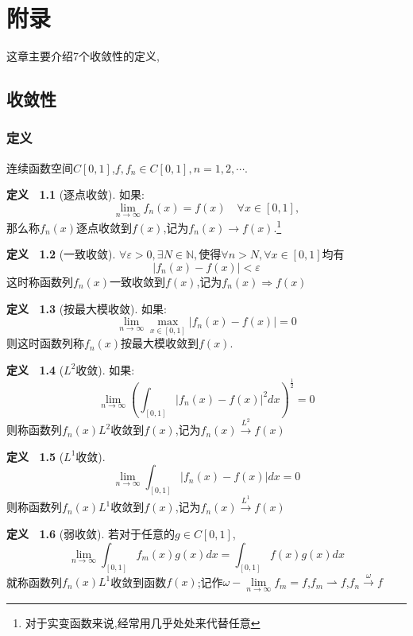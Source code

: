 \documentclass{ctexbook}
\theoremstyle{plain}
\theoremstyle{definition}
\newtheorem{defn}{定义~}[chapter]
\begin{document}
\chapter{附录}
这章主要介绍7个收敛性的定义,
\section{收敛性}
\subsection{定义}
\noindent
连续函数空间$C[0,1]$,$f,f_n\in C[0,1],n=1,2,\cdots$.

\begin{defn}[逐点收敛]\label{pointcon}
如果:
\[\lim_{n \to \infty}f_n(x)=f(x) \quad \forall x \in [0,1],\]
那么称$f_n(x)$逐点收敛到$f(x)$,记为$f_n(x)\rightarrow f(x)$.\footnote{对于实变函数来说,经常用几乎处处来代替任意}
\end{defn}

\begin{defn}[一致收敛]\label{uniformcon}
$\forall \varepsilon >0,\exists N\in \mathbb{N},使得\forall n>N,\forall x\in[0,1]$均有
\[|f_n(x)-f(x)|<\varepsilon\]
这时称函数列$f_n(x)$一致收敛到$f(x)$,记为$f_n(x)\Rightarrow f(x)$
\end{defn}

\begin{defn}[按最大模收敛]\label{maxcon}
如果:
\[\lim_{n \to \infty}\max_{x \in [0,1]}|f_n(x)-f(x)|=0\]
则这时函数列称$f_n(x)$按最大模收敛到$f(x)$.
\end{defn}

\begin{defn}[$L^2$收敛]如果:\label{ltwo}
\[\lim_{n \to \infty}\left(\int_{[0,1]} |f_n(x)-f(x)|^2dx\right) ^\frac{1}{2}=0\]
则称函数列$f_n(x)$$L^2$收敛到$f(x)$,记为$f_n(x)\xrightarrow{L^2}f(x)$
\end{defn}

\begin{defn}[$L^1$收敛]\label{lone}
\[\lim_{n \to \infty}\int_{[0,1]} |f_n(x)-f(x)|dx =0\]
则称函数列$f_n(x)$$L^1$收敛到$f(x)$,记为$f_n(x)\xrightarrow{L^1}f(x)$
\end{defn}

\begin{defn}[弱收敛]\label{wcon}
若对于任意的$g \in C[0,1]$,
\[\lim_{n \to \infty}\int_{[0,1]}f_m(x)g(x)dx=\int_{[0,1]}f(x)g(x)dx\]
就称函数列$f_n(x)$$L^1$收敛到函数$f(x)$;记作$\omega-\lim \limits_{n\to \infty}f_m=f$,$f_m\rightharpoonup f$,$f_n \xrightarrow{\omega}f$
\end{defn}
\end{document}
